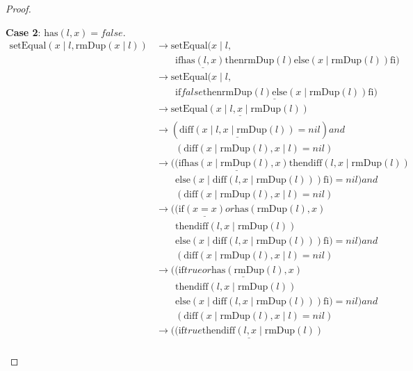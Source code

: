 \documentclass[12pt, a4paper]{article}
\newcommand{\rel}[1]{\mathrel{#1}}
\newcommand{\rmx}[1]{\mathrm{#1}}
\newcommand{\larrow}{\longrightarrow}
\newcommand{\under}{\underline}
\begin{document}
\begin{proof}
\begin{description}
\textbf{Case 2}: $\rmx{has}(l, x) = false$.
\begin{align*}
\rmx{setEqual}(x \mid l, \rmx{rmDup}(x \mid l))
	&\larrow \rmx{setEqual}(x \mid l, \\
	&\quad \quad \rel{\rmx{if}} \under{\rmx{has}(l, x)} \rel{\rmx{then}} \rmx{rmDup}(l) \rel{\rmx{else}} (x \mid \rmx{rmDup}(l)) \rel{\rmx{fi}}) \tag{by rmDup2} \\
	&\larrow \rmx{setEqual}(x \mid l, \\
	&\quad \quad \under{\rel{\rmx{if}} false \rel{\rmx{then}} \rmx{rmDup}(l) \rel{\rmx{else}} (x \mid \rmx{rmDup}(l)) \rel{\rmx{fi}}}) \tag{by case splitting} \\
	&\larrow \under{\rmx{setEqual}(x \mid l, x \mid \rmx{rmDup}(l))} \tag{by if2} \\
	&\larrow (\under{\rmx{diff}(x \mid l, x \mid \rmx{rmDup}(l))} = nil) \rel{and} \\
	&\quad \quad (\rmx{diff}(x \mid \rmx{rmDup}(l), x \mid l) = nil) \tag{by setEq} \\
	&\larrow ((\rel{\rmx{if}} \under{\rmx{has}(x \mid \rmx{rmDup}(l), x)} \rel{\rmx{then}} \rmx{diff}(l, x \mid \rmx{rmDup}(l)) \\
	&\quad \quad \rel{\rmx{else}} (x \mid \rmx{diff}(l, x \mid \rmx{rmDup}(l))) \rel{\rmx{fi}}) = nil) \rel{and} \\
	&\quad \quad (\rmx{diff}(x \mid \rmx{rmDup}(l), x \mid l) = nil) \tag{by diff2} \\
	&\larrow ((\rel{\rmx{if}} \under{(x = x)} \rel{or} \rmx{has}(\rmx{rmDup}(l), x) \\
	&\quad \quad \rel{\rmx{then}} \rmx{diff}(l, x \mid \rmx{rmDup}(l)) \\
	&\quad \quad \rel{\rmx{else}} (x \mid \rmx{diff}(l, x \mid \rmx{rmDup}(l))) \rel{\rmx{fi}}) = nil) \rel{and} \\
	&\quad \quad (\rmx{diff}(x \mid \rmx{rmDup}(l), x \mid l) = nil) \tag{by has2} \\
	&\larrow ((\rel{\rmx{if}} \under{true \rel{or} \rmx{has}(\rmx{rmDup}(l), x)} \\
	&\quad \quad \rel{\rmx{then}} \rmx{diff}(l, x \mid \rmx{rmDup}(l)) \\
	&\quad \quad \rel{\rmx{else}} (x \mid \rmx{diff}(l, x \mid \rmx{rmDup}(l))) \rel{\rmx{fi}}) = nil) \rel{and} \\
	&\quad \quad (\rmx{diff}(x \mid \rmx{rmDup}(l), x \mid l) = nil) \tag{by equality} \\
	&\larrow (\under{(\rel{\rmx{if}} true \rel{\rmx{then}} \rmx{diff}(l, x \mid \rmx{rmDup}(l))} \\

\end{align*}
\end{description}
\end{proof}
\end{document}
